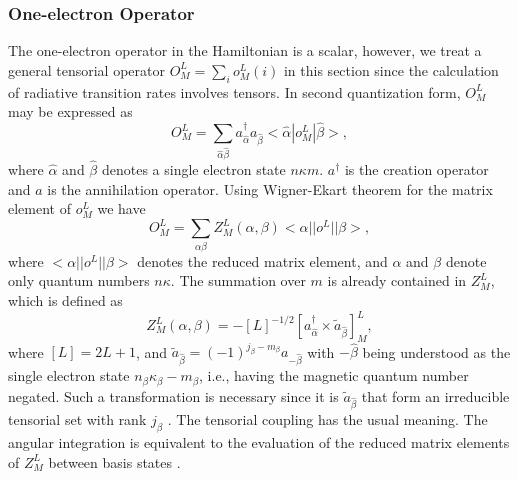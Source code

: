 \documentclass{elsart}
\begin{document}
\subsubsection{One-electron Operator}
The one-electron operator in the Hamiltonian is a scalar, however, we treat a
general tensorial operator $O^L_M = \sum_i o^L_M(i)$ in this section since the
calculation of 
radiative transition rates involves tensors. In second quantization form,
$O^L_M$ may be expressed as 
\begin{equation}
O^L_M = \sum_{\hat{\alpha}\hat{\beta}} a^{\dagger}_{\hat{\alpha}} 
a_{\hat{\beta}} <\hat{\alpha}|o^L_M|\hat{\beta}>,
\end{equation}
where $\hat{\alpha}$ and $\hat{\beta}$ denotes a single electron state
$n\kappa m$.  
$a^{\dagger}$ is the creation operator and $a$ is the annihilation operator. Using
Wigner-Ekart theorem for the matrix element of $o^L_M$ we have 
\begin{equation}
O^L_M = \sum_{\alpha\beta} Z^L_M(\alpha,\beta) 
<\alpha||o^L||\beta>,
\end{equation}
where $<\alpha||o^L||\beta>$ denotes the reduced matrix element, and
$\alpha$ and $\beta$ denote only quantum numbers $n\kappa$. The
summation over $m$ is already contained in $Z^L_M$, which is defined as
\begin{equation}
Z^L_M(\alpha,\beta) = 
-[L]^{-1/2}\left[a^{\dagger}_{\hat{\alpha}} \times \tilde{a}_{\hat{\beta}}\right]^L_M,
\end{equation}
where $[L] = 2L+1$, and $\tilde{a}_{\hat{\beta}} = (-1)^{j_\beta -
m_\beta}a_{-\hat{\beta}}$ 
with $-\hat{\beta}$ being understood as the single electron state
$n_\beta\kappa_\beta -\!m_\beta$, i.e., having the magnetic quantum number
negated. Such a transformation is necessary   
since it is $\tilde{a}_{\hat{\beta}}$ that form an irreducible tensorial set
with rank 
$j_\beta$ \citep{judd67}. The tensorial coupling has the usual meaning. The
angular integration is equivalent to the 
evaluation of the reduced matrix elements of $Z^L_M$ between basis states 
\citep{gaigalas97}. 
\end{document}
